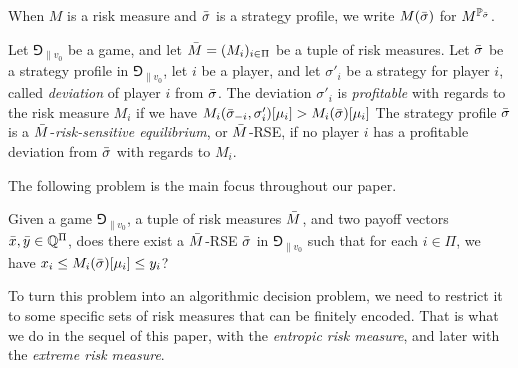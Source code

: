 When $M$ is a risk measure and ${\bar{\sigma}}$ is a strategy profile, we write $M({\bar{\sigma}})$ for $M^{\mathbb{P}_{\bar{\sigma}}}$.

\begin{definition}
    Let $\Game_{\|v_0}$ be a game, and let $\bar{M} = (M_i)_{i \in \Pi}$ be a tuple of risk measures.
    Let ${\bar{\sigma}}$ be a strategy profile in $\Game_{\|v_0}$, let $i$ be a player, and let $\sigma'_i$ be a strategy for player $i$, called \emph{deviation} of player $i$ from ${\bar{\sigma}}$.
    The deviation $\sigma'_i$ is \emph{profitable} with regards to the risk measure $M_i$ if we have $M_i({\bar{\sigma}}_{-i}, \sigma'_i)[\mu_i] > M_i({\bar{\sigma}})[\mu_i]$
    The strategy profile ${\bar{\sigma}}$ is a $\bar{M}$-\emph{risk-sensitive equilibrium}, or $\bar{M}$-RSE, if no player $i$ has a profitable deviation from ${\bar{\sigma}}$ with regards to $M_i$.
\end{definition}



The following problem is the main focus throughout our paper.

\begin{question}
    Given a game $\Game_{\|v_0}$, a tuple of risk measures $\bar{M}$, and two payoff vectors ${\bar{x}}, {\bar{y}} \in \mathbb{Q}^\Pi$, does there exist a $\bar{M}$-RSE ${\bar{\sigma}}$ in $\Game_{\|v_0}$ such that for each $i \in \Pi$, we have $x_i \leq M_i({\bar{\sigma}})[\mu_i] \leq y_i$?
\end{question}

To turn this problem into an algorithmic decision problem, we need to restrict it to some specific sets of risk measures that can be finitely encoded. 
That is what we do in the sequel of this paper, with the \emph{entropic risk measure}, and later with the \emph{extreme risk measure}.





